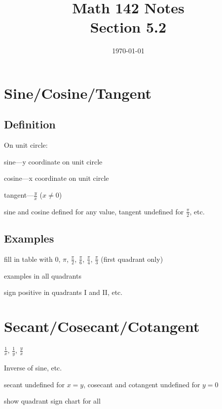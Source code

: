 \documentclass{exam}
\title{Math 142 Notes \\ Section 5.2}
\date{\today}
\begin{document}
  \maketitle
  \tableofcontents

  \section{Sine/Cosine/Tangent}

  \subsection{Definition}

  On unit circle:
  \begin{itemize*}
    \item sine---y coordinate on unit circle
    \item cosine---x coordinate on unit circle
    \item tangent---$\frac{y}{x}$ ($x \neq 0$)
    \item sine and cosine defined for any value, tangent undefined for $\frac{\pi}{2}$, etc.
  \end{itemize*}

  \subsection{Examples}

  \begin{itemize*}
    \item fill in table with 0, $\pi$, $\frac{\pi}{2}$, $\frac{\pi}{6}$, $\frac{\pi}{4}$, $\frac{\pi}{3}$ (first
      quadrant only)
    \item examples in all quadrants
    \item sign positive in quadrants I and II, etc.
  \end{itemize*}

  \section{Secant/Cosecant/Cotangent}
  \begin{itemize*}
    \item $\frac{1}{x}$, $\frac{1}{y}$, $\frac{y}{x}$
    \item Inverse of sine, etc.
    \item secant undefined for $x = y$, cosecant and cotangent undefined for $y = 0$
    \item show quadrant sign chart for all
  \end{itemize*}
\end{document}

